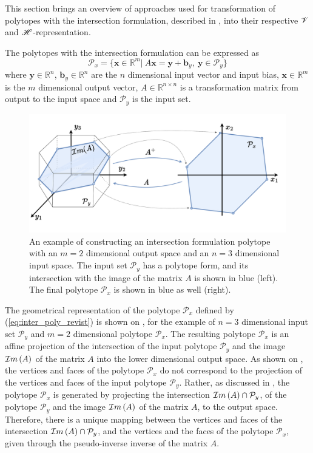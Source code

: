 This section brings an overview of approaches used for transformation of polytopes with the intersection formulation, described in , into their respective $\mathscr{V}$ and $\mathscr{H}$-representation. 

The polytopes with the intersection formulation can be expressed as
\begin{equation}
    \mathcal{P}_x=\{\bm{x}\in\mathbb{R}^m |~ A\bm{x} = \bm{y} + \bm{b}_y,~\bm{y} \in \mathcal{P}_y  \}
    \label{eq:inter_poly_revist}
\end{equation}
where $\bm{y}\in\mathbb{R}^n$, $\bm{b}_y\in\mathbb{R}^n$ are the $n$ dimensional input vector and input bias, $\bm{x}\in\mathbb{R}^m$ is the $m$ dimensional output vector, $A\in\mathbb{R}^{n\times n}$ is a transformation matrix from output to the input space and $\mathcal{P}_y$ is the input set.

\label{ch:inter_poly_chapter}
\begin{figure}[!t]
    \centering
    \includegraphics[width=0.8\linewidth]{Chapters/imgs/inter_poly.pdf}
    \caption{An example of constructing an intersection formulation polytope with an $m=2$ dimensional output space and an $n=3$ dimensional input space. The input set $\mathcal{P}_y$ has a polytope form, and its intersection with the image of the matrix $A$ is shown in blue (left). The final polytope $\mathcal{P}_x$ is shown in blue as well (right).}
    \label{fig:inter_poly}
\end{figure}

The geometrical representation of the polytope $\mathcal{P}_x$ defined by (\ref{eq:inter_poly_revist}) is shown on , for the example of $n=3$ dimensional input set $\mathcal{P}_y$ and $m=2$ dimensional polytope $\mathcal{P}_x$. 
The resulting polytope $\mathcal{P}_x$ is an affine projection of the intersection of the input polytope $\mathcal{P}_y$ and the image $\mathcal{I}m\left(A\right)$ of the matrix $A$ into the lower dimensional output space. As shown on , the vertices and faces of the polytope $\mathcal{P}_x$ do not correspond to the projection of the vertices and faces of the input polytope $\mathcal{P}_y$. 
Rather, as discussed in , the polytope $\mathcal{P}_x$ is generated by projecting the intersection $\mathcal{I}m\left(A\right)\cap\mathcal{P}_y$, of the polytope $\mathcal{P}_y$ and the image $\mathcal{I}m\left(A\right)$ of the matrix $A$, to the output space. 
Therefore, there is a unique mapping between the vertices and faces of the intersection $\mathcal{I}m\left(A\right)\cap\mathcal{P}_y$, and the vertices and the faces of the polytope $\mathcal{P}_x$, given through the pseudo-inverse inverse \cite{wang2018generalized} of the matrix $A$. 

